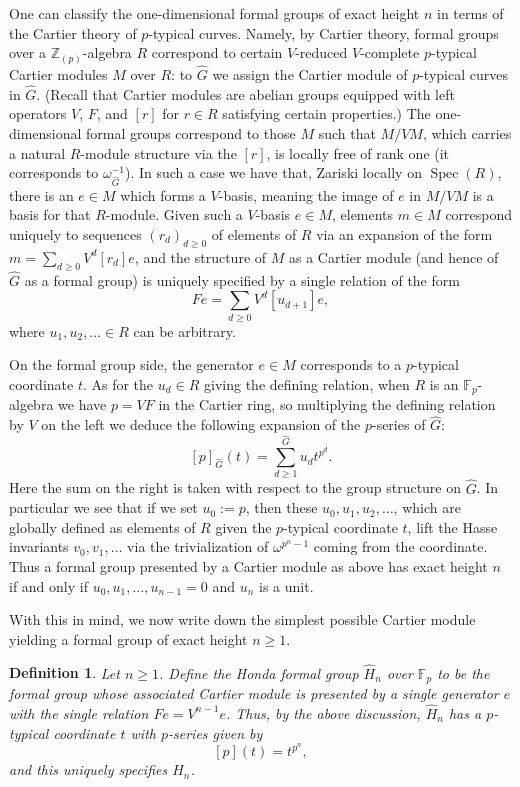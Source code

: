 \documentclass[12pt]{article}
\newtheorem{definition}[theorem]{Definition}
\newcommand{\on}{\operatorname}
\begin{document}
One can classify the one-dimensional formal groups of exact height $n$ in terms of the Cartier theory of $p$-typical curves.  Namely, by Cartier theory, formal groups over a $\mathbb{Z}_{(p)}$-algebra $R$ correspond to certain $V$-reduced $V$-complete $p$-typical Cartier modules $M$ over $R$: to $\widehat{G}$ we assign the Cartier module of $p$-typical curves in $\widehat{G}$.  (Recall that Cartier modules are abelian groups equipped with left operators $V$, $F$, and $[r]$ for $r\in R$ satisfying certain properties.)   The one-dimensional formal groups correspond to those $M$ such that $M/VM$, which carries a natural $R$-module structure via the $[r]$, is locally free of rank one (it corresponds to $\omega_{\widehat{G}}^{-1}$).  In such a case we have that, Zariski locally on $\on{Spec}(R)$, there is an $e\in M$ which forms a $V$-basis, meaning the image of $e$ in $M/VM$ is a basis for that $R$-module.  Given such a $V$-basis $e\in M$, elements $m\in M$ correspond uniquely to sequences $(r_d)_{d\geq 0}$ of elements of $R$ via an expansion of the form $m=\sum_{d\geq 0} V^d[r_d]e$, and the structure of $M$ as a Cartier module (and hence of $\widehat{G}$ as a formal group) is uniquely specified by a single relation of the form
$$Fe = \sum_{d\geq 0} V^d [u_{d+1}]e,$$
where $u_1,u_2,\ldots \in R$ can be arbitrary.

On the formal group side, the generator $e\in M$ corresponds to a $p$-typical coordinate $t$.  As for the $u_d\in R$ giving the defining relation, when $R$ is an $\mathbb{F}_p$-algebra we have $p=VF$ in the Cartier ring, so multiplying the defining relation by $V$ on the left we deduce the following expansion of the $p$-series of $\widehat{G}$:
$$[p]_{\widehat{G}}(t) = \sum_{d\geq 1}^{\widehat{G}} u_d t^{p^d}.$$
Here the sum on the right is taken with respect to the group structure on $\widehat{G}$.  In particular we see that if we set $u_0:=p$, then these $u_0,u_1,u_2,\ldots$, which are globally defined as elements of $R$ given the $p$-typical coordinate $t$, lift the Hasse invariants $v_0,v_1,\ldots$ via the trivialization of $\omega^{p^n-1}$ coming from the coordinate.  Thus a formal group presented by a Cartier module as above has exact height $n$ if and only if $u_0,u_1,\ldots,u_{n-1}=0$ and $u_n$ is a unit.

With this in mind, we now write down the simplest possible Cartier module yielding a formal group of exact height $n\geq 1$.

\begin{definition}
Let $n\geq 1$.  Define the \emph{Honda formal group} $\widehat{H}_n$ over $\mathbb{F}_{p}$ to be the formal group whose associated Cartier module is presented by a single generator $e$ with the single relation $Fe=V^{n-1}e$.  Thus, by the above discussion, $\widehat{H}_n$ has a $p$-typical coordinate $t$ with $p$-series given by
$$[p](t) = t^{p^n},$$
and this uniquely specifies $\widehat{H}_n$.
\end{definition}
\end{document}
